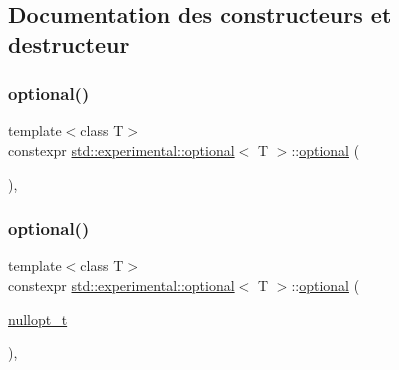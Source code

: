 \subsection{Documentation des constructeurs et destructeur}
\mbox{\label{classstd_1_1experimental_1_1optional_a1584b48b65b92c4666c9899cd8b034e0}} 
\subsubsection{\texorpdfstring{optional()}{optional()}\hspace{0.1cm}{\footnotesize\ttfamily [1/8]}}
{\footnotesize\ttfamily template$<$class T$>$ \\
constexpr \hyperlink{classstd_1_1experimental_1_1optional}{std\+::experimental\+::optional}$<$ T $>$\+::\hyperlink{classstd_1_1experimental_1_1optional}{optional} (\begin{DoxyParamCaption}{ }\end{DoxyParamCaption})\hspace{0.3cm}{\ttfamily [inline]}, {\ttfamily [noexcept]}}

\mbox{\label{classstd_1_1experimental_1_1optional_a4254acbb52e75c196ab02784ce4b1ce2}} 
\subsubsection{\texorpdfstring{optional()}{optional()}\hspace{0.1cm}{\footnotesize\ttfamily [2/8]}}
{\footnotesize\ttfamily template$<$class T$>$ \\
constexpr \hyperlink{classstd_1_1experimental_1_1optional}{std\+::experimental\+::optional}$<$ T $>$\+::\hyperlink{classstd_1_1experimental_1_1optional}{optional} (\begin{DoxyParamCaption}\item[{\hyperlink{structstd_1_1experimental_1_1nullopt__t}{nullopt\+\_\+t}}]{ }\end{DoxyParamCaption})\hspace{0.3cm}{\ttfamily [inline]}, {\ttfamily [noexcept]}}

